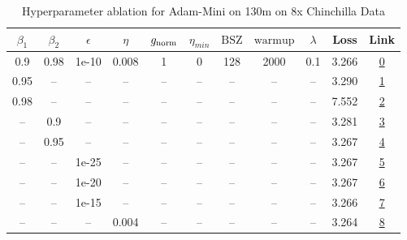 \begin{table}[H]
\centering
\caption{Hyperparameter ablation for Adam-Mini on 130m on 8x Chinchilla Data}
\label{tab:ablation_adam-mini_130m_on_8x_chinchilla_data}
\begin{tabular}{ccccccccccc}
\toprule
$\beta_1$ & $\beta_2$ & $\epsilon$ & $\eta$ & $g_{\mathrm{norm}}$ & $\eta_{min}$ & $\mathrm{BSZ}$ & $\mathrm{warmup}$ & $\lambda$ & Loss & Link \\
\midrule
0.9 & 0.98 & 1e-10 & 0.008 & 1 & 0 & 128 & 2000 & 0.1 & 3.266 & \href{https://wandb.ai/marin-community/optimizer-scaling/runs/sweep-130m-21B-miniac2e1elr0.008-wd0.1-minlr0-warmup2000-b10.9-b-d489dc}{0} \\
\midrule
0.95 & -- & -- & -- & -- & -- & -- & -- & -- & 3.290 & \href{https://wandb.ai/marin-community/optimizer-scaling/runs/sweep-130m-21B-mini117b84lr0.008-wd0.1-minlr0-warmup2000-b10.95--817e0e}{1} \\
0.98 & -- & -- & -- & -- & -- & -- & -- & -- & 7.552 & \href{https://wandb.ai/marin-community/optimizer-scaling/runs/sweep-130m-21B-mini9179b1lr0.008-wd0.1-minlr0-warmup2000-b10.98--93bc9f}{2} \\
-- & 0.9 & -- & -- & -- & -- & -- & -- & -- & 3.281 & \href{https://wandb.ai/marin-community/optimizer-scaling/runs/sweep-130m-21B-minic5318dlr0.008-wd0.1-minlr0-warmup2000-b10.9-b-6f8a67}{3} \\
-- & 0.95 & -- & -- & -- & -- & -- & -- & -- & 3.267 & \href{https://wandb.ai/marin-community/optimizer-scaling/runs/sweep-130m-21B-minic96875lr0.008-wd0.1-minlr0-warmup2000-b10.9-b-fa1dd8}{4} \\
-- & -- & 1e-25 & -- & -- & -- & -- & -- & -- & 3.267 & \href{https://wandb.ai/marin-community/optimizer-scaling/runs/sweep-130m-21B-minidd3b3clr0.008-wd0.1-minlr0-warmup2000-b10.9-b-1d94ce}{5} \\
-- & -- & 1e-20 & -- & -- & -- & -- & -- & -- & 3.267 & \href{https://wandb.ai/marin-community/optimizer-scaling/runs/sweep-130m-21B-mini88561dlr0.008-wd0.1-minlr0-warmup2000-b10.9-b-f66e88}{6} \\
-- & -- & 1e-15 & -- & -- & -- & -- & -- & -- & 3.266 & \href{https://wandb.ai/marin-community/optimizer-scaling/runs/sweep-130m-21B-mini3c1780lr0.008-wd0.1-minlr0-warmup2000-b10.9-b-9a05a7}{7} \\
-- & -- & -- & 0.004 & -- & -- & -- & -- & -- & 3.264 & \href{https://wandb.ai/marin-community/optimizer-scaling/runs/sweep-130m-21B-mini5c5f85lr0.004-wd0.1-minlr0-warmup2000-b10.9-b-eaf3db}{8} \\

\end{tabular}
\end{table}
